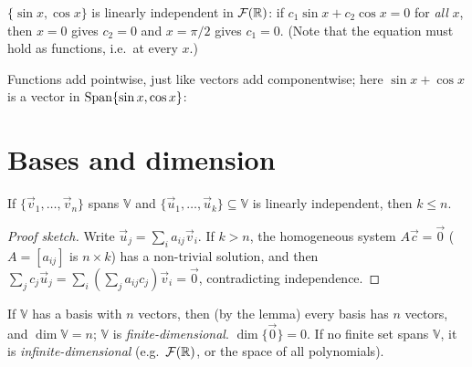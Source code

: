 \begin{example}[Functions]
$\{\sin x,\cos x\}$ is linearly independent in $\mathcal F(\mathbb{R})$: if $c_1\sin x+c_2\cos x=0$ for \emph{all}
$x$, then $x=0$ gives $c_2=0$ and $x=\pi/2$ gives $c_1=0$. (Note that the equation must hold as functions, i.e.\
at every $x$.)
\end{example}

Functions add pointwise, just like vectors add componentwise; here $\sin x + \cos x$ is a vector
in $\operatorname{Span}\{\sin x,\cos x\}$:
\begin{center}
\end{center}

\section{Bases and dimension}

\begin{theorem}
If $\{\vec v_1,\dots,\vec v_n\}$ spans $\mathbb V$ and $\{\vec u_1,\dots,\vec u_k\}\subseteq\mathbb V$ is linearly
independent, then $k\le n$.
\end{theorem}
\begin{proof}[Proof sketch]
Write $\vec u_j=\sum_i a_{ij}\vec v_i$. If $k>n$, the homogeneous system $A\vec c=\vec 0$ ($A=[a_{ij}]$ is $n\times k$)
has a non-trivial solution, and then $\sum_jc_j\vec u_j=\sum_i(\sum_ja_{ij}c_j)\vec v_i=\vec 0$, contradicting
independence.
\end{proof}

\begin{definition}[Dimension]
If $\mathbb V$ has a basis with $n$ vectors, then (by the lemma) every basis has $n$ vectors, and
$\dim\mathbb V=n$; $\mathbb V$ is \emph{finite-dimensional}. $\dim\{\vec0\}=0$. If no finite set spans
$\mathbb V$, it is \emph{infinite-dimensional} (e.g.\ $\mathcal F(\mathbb{R})$, or the space of all polynomials).
\end{definition}

